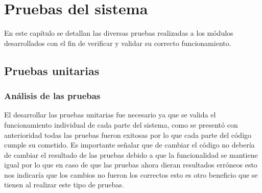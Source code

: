 \chapter{Pruebas del sistema}

En este capítulo se detallan las diversas pruebas realizadas a los módulos desarrollados con el fin de verificar y validar su correcto funcionamiento.

\section{Pruebas unitarias}


\subsection{Análisis de las pruebas}
El desarrollar las pruebas unitarias fue necesario ya que se valida el funcionamiento individual de cada parte del sistema, como se presentó con anterioridad todas las pruebas fueron exitosas por lo que cada parte del código cumple su cometido. Es importante señalar que de cambiar el código no debería de cambiar el resultado de las pruebas debido a que la funcionalidad se mantiene igual por lo que en caso de que las pruebas ahora dieran resultados erróneos esto nos indicaría que los cambios no fueron los correctos esto es otro beneficio que se tienen al realizar este tipo de pruebas.
